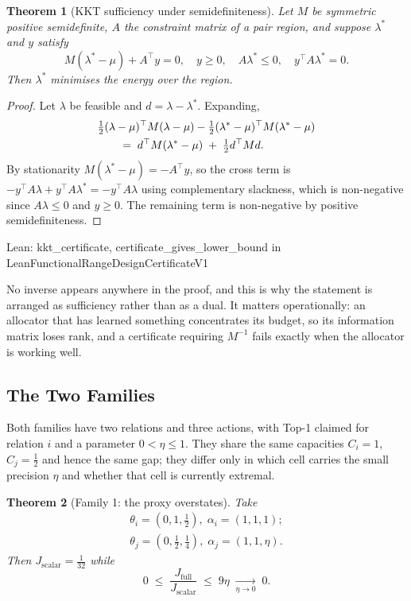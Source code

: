 \documentclass[conference]{IEEEtran}
\newtheorem{theorem}{Theorem}
\theoremstyle{definition}
\newcommand{\lean}[1]{\textsf{\footnotesize #1}}
\newcommand{\leanbox}[1]{%
  \par\vspace{2pt}\noindent
  {\footnotesize\textsf{Lean: #1}}\par\vspace{2pt}}
\begin{document}
\begin{theorem}[KKT sufficiency under semidefiniteness]
\label{thm:fn-kkt}
Let $M$ be symmetric positive semidefinite, $A$ the constraint matrix of a pair region, and
suppose $\lambda^{*}$ and $y$ satisfy
\begin{equation}
M(\lambda^{*}-\mu)+A^{\top}y=0,\quad
y\geq 0,\quad
A\lambda^{*}\leq 0,\quad
y^{\top}A\lambda^{*}=0 .
\label{eq:fn-kkt}
\end{equation}
Then $\lambda^{*}$ minimises the energy over the region.
\end{theorem}

\begin{proof}
Let $\lambda$ be feasible and $d=\lambda-\lambda^{*}$. Expanding,
\begin{align}
&\tfrac12(\lambda-\mu)^{\top}M(\lambda-\mu)
 -\tfrac12(\lambda^{*}-\mu)^{\top}M(\lambda^{*}-\mu) \notag\\
&\qquad=\;d^{\top}M(\lambda^{*}-\mu)\;+\;\tfrac12 d^{\top}Md .
\end{align}
By stationarity $M(\lambda^{*}-\mu)=-A^{\top}y$, so the cross term is
$-y^{\top}A\lambda+y^{\top}A\lambda^{*}=-y^{\top}A\lambda$ using complementary slackness,
which is non-negative since $A\lambda\le0$ and $y\ge0$. The remaining term is non-negative by
positive semidefiniteness.
\end{proof}

\leanbox{\lean{kkt\_certificate}, \lean{certificate\_gives\_lower\_bound} in
\lean{LeanFunctionalRangeDesignCertificateV1}}

No inverse appears anywhere in the proof, and this is why the statement is arranged as
sufficiency rather than as a dual. It matters operationally: an allocator that has learned
something concentrates its budget, so its information matrix loses rank, and a certificate
requiring $M^{-1}$ fails exactly when the allocator is working well.

\subsection{The Two Families}
\label{sec:fn-families}

Both families have two relations and three actions, with Top-1 claimed for relation $i$ and a
parameter $0<\eta\le1$. They share the same capacities $C_{i}=1$, $C_{j}=\tfrac12$ and hence
the same gap; they differ only in which cell carries the small precision $\eta$ and whether
that cell is currently extremal.

\begin{theorem}[Family 1: the proxy overstates]
\label{thm:fn-family1}
Take
\begin{align}
\theta_{i}=(0,1,\tfrac12),\;\alpha_{i}=(1,1,1);\\
\theta_{j}=(0,\tfrac12,\tfrac14),\;\alpha_{j}=(1,1,\eta).
\end{align}
Then $J_{\mathrm{scalar}}=\tfrac{1}{32}$ while
\begin{equation}
0\;\leq\;\frac{J_{\mathrm{full}}}{J_{\mathrm{scalar}}}\;\leq\;9\eta
\;\xrightarrow[\eta\to0]{}\;0 .
\label{eq:fn-family1}
\end{equation}
\end{theorem}
\end{document}
